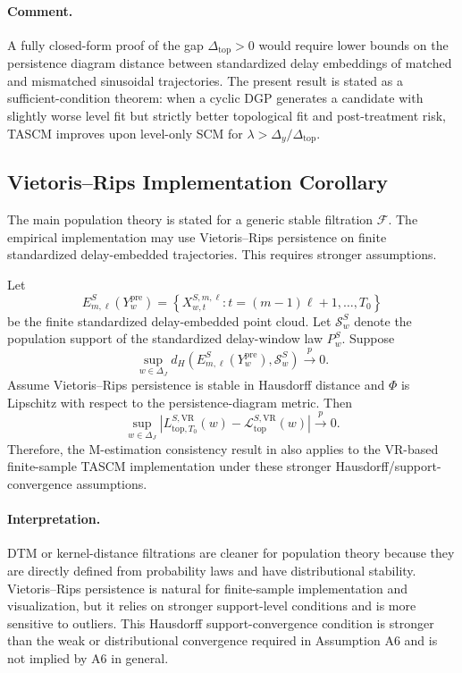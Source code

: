 \documentclass[11pt]{article}
\theoremstyle{plain}
\theoremstyle{definition}
\theoremstyle{remark}
\newcommand{\1}{\mathbbm{1}}
\newcommand{\pre}{\mathrm{pre}}
\newcommand{\pto}{\xrightarrow{p}}
\begin{document}
\paragraph{Comment.}
A fully closed-form proof of the gap
\(\Delta_{\mathrm{top}}>0\) would require lower bounds on the persistence
diagram distance between standardized delay embeddings of matched and
mismatched sinusoidal trajectories. The present result is stated as a
sufficient-condition theorem: when a cyclic DGP generates a candidate with
slightly worse level fit but strictly better topological fit and post-treatment
risk, TASCM improves upon level-only SCM for
\(\lambda>\Delta_y/\Delta_{\mathrm{top}}\).

\subsection{Vietoris--Rips Implementation Corollary}

The main population theory is stated for a generic stable filtration
\(\mathcal F\). The empirical implementation may use Vietoris--Rips persistence
on finite standardized delay-embedded trajectories. This requires stronger
assumptions.

Let
\[
E_{m,\ell}^{S}(Y_w^{\pre})
=
\left\{
X_{w,t}^{S,m,\ell}:
t=(m-1)\ell+1,\ldots,T_0
\right\}
\]
be the finite standardized delay-embedded point cloud. Let
\(\mathcal S_w^{S}\) denote the population support of the standardized
delay-window law \(P_w^{S}\). Suppose
\[
\sup_{w\in\Delta_J}
d_H
\left(
E_{m,\ell}^{S}(Y_w^{\pre}),
\mathcal S_w^{S}
\right)
\pto 0.
\]
Assume Vietoris--Rips persistence is stable in Hausdorff distance and \(\Phi\)
is Lipschitz with respect to the persistence-diagram metric. Then
\[
\sup_{w\in\Delta_J}
\left|
L_{\mathrm{top},T_0}^{S,\mathrm{VR}}(w)
-
\mathcal L_{\mathrm{top}}^{S,\mathrm{VR}}(w)
\right|
\pto 0.
\]
Therefore, the M-estimation consistency result in  also
applies to the VR-based finite-sample TASCM implementation under these stronger
Hausdorff/support-convergence assumptions.

\paragraph{Interpretation.}
DTM or kernel-distance filtrations are cleaner for population theory because
they are directly defined from probability laws and have distributional
stability. Vietoris--Rips persistence is natural for finite-sample
implementation and visualization, but it relies on stronger support-level
conditions and is more sensitive to outliers. This Hausdorff support-convergence
condition is stronger than the weak or distributional convergence required in
Assumption A6 and is not implied by A6 in general.
\end{document}
